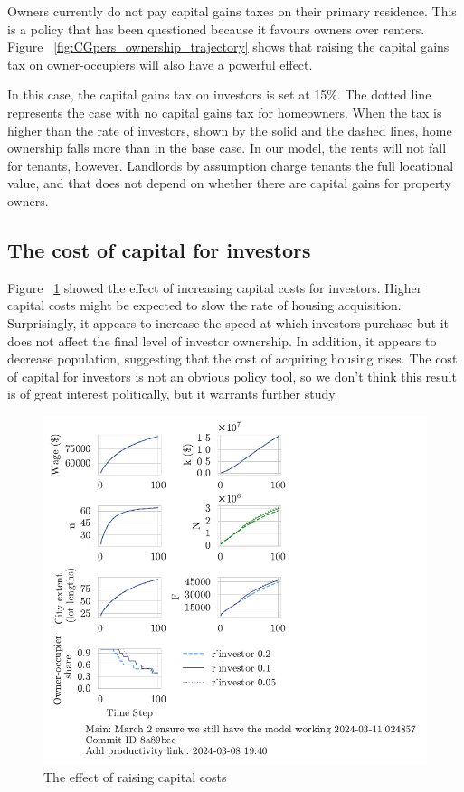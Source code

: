 Owners currently do not pay capital gains taxes on their primary residence. This is a policy that has been questioned %
because it favours owners over renters.  Figure ~\ref{fig:CGpers_ownership_trajectory} shows that raising the capital gains tax on owner-occupiers will also have a powerful effect. 

In this case, the capital gains tax on investors is set at 15\%. The dotted line represents the case with no capital gains tax for homeowners. When the tax is higher than the rate of investors, shown by the solid and the dashed lines,  home ownership falls more than in the base case. In our model, the rents will not fall for tenants, however. Landlords by assumption charge tenants the full locational value, and that does not depend on whether there are capital gains for property owners.




\subsection{The cost of capital for investors}

Figure ~\ref{fig:capital_ownership_trajectory} showed the effect of increasing capital costs for investors. Higher capital costs might be expected to slow the rate of housing acquisition. Surprisingly, it appears to increase the speed at which investors purchase but it does not affect the final level of investor ownership.  In addition, it appears to decrease population, suggesting that the cost of acquiring housing rises. The cost of capital for investors is not an obvious policy tool, so we don't think this result is of great interest politically, but it warrants further study.

\begin{figure}[h!t]
    \centering
    \includegraphics[scale=1., trim={0 1.4cm 0 0},clip]{fig/r_investor-Main-024857.pdf}
    \caption{The effect of raising capital costs}
    \label{fig:capital_ownership_trajectory}
\end{figure}

